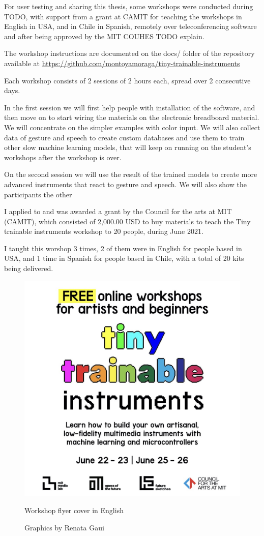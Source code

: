 For user testing and sharing this thesis, some workshops were conducted during TODO, with support from a grant at CAMIT for teaching the workshops in English in USA, and in Chile in Spanish, remotely over teleconferencing software and after being approved by the MIT COUHES TODO explain.

The workshop instructions are documented on the docs/ folder of the repository available at \url{https://github.com/montoyamoraga/tiny-trainable-instruments}

Each workshop consists of 2 sessions of 2 hours each, spread over 2 consecutive days.

In the first session we will first help people with installation of the software, and then move on to start wiring the materials on the electronic breadboard material. We will concentrate on the simpler examples with color input. We will also collect data of gesture and speech to create custom databases and use them to train other slow machine learning models, that will keep on running on the student's workshops after the workshop is over.

On the second session we will use the result of the trained models to create more advanced instruments that react to gesture and speech. We will also show the participants the other 

I applied to and was awarded a grant by the Council for the arts at MIT (CAMIT), which consisted of 2,000.00 USD to buy materials to teach the Tiny trainable instruments workshop to 20 people, during June 2021.

I taught this worshop 3 times, 2 of them were in English for people based in USA, and 1 time in Spanish for people based in Chile, with a total of 20 kits being delivered.

\begin{figure}[ht]
  \centering
  \includegraphics[width=0.75\linewidth,height=0.35\textheight,keepaspectratio]{images/workshop-en-1.jpg}
  \caption{Workshop flyer cover in English}
  \caption*{Graphics by Renata Gaui}
  \label{fig:workshop-english-flyer-page-1}
\end{figure}

